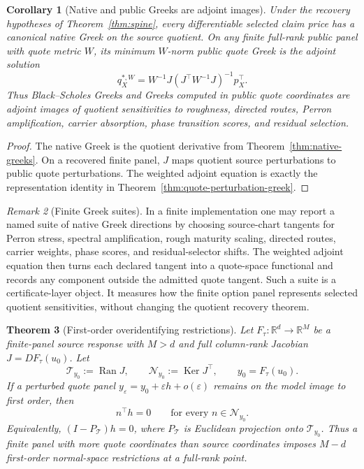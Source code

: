 \documentclass[11pt,a4paper]{amsart}
\theoremstyle{plain}
\newtheorem{theorem}{Theorem}[section]
\newtheorem{corollary}[theorem]{Corollary}
\theoremstyle{definition}
\theoremstyle{remark}
\newtheorem{remark}[theorem]{Remark}
\DeclareMathOperator{\Ker}{Ker}
\DeclareMathOperator{\Ran}{Ran}
\newcommand{\R}{\mathbb{R}}
\newcommand{\cN}{\mathcal{N}}
\newcommand{\cT}{\mathcal{T}}
\newcommand{\eps}{\varepsilon}
\begin{document}
\begin{corollary}[Native and public Greeks are adjoint images]\label{cor:native-public-greek-correspondence}
Under the recovery hypotheses of Theorem~\ref{thm:spine}, every differentiable selected claim
price has a canonical native Greek on the source quotient.  On any finite full-rank public panel
with quote metric \(W\), its minimum \(W\)-norm public quote Greek is the adjoint solution
\[
        q_X^{*,W}
        =
        W^{-1}J(J^\top W^{-1}J)^{-1}p_X^\top .
\]
Thus Black--Scholes Greeks and Greeks computed in public quote coordinates are adjoint images of
quotient sensitivities to roughness, directed routes, Perron amplification, carrier absorption,
phase transition scores, and residual selection.
\end{corollary}

\begin{proof}
The native Greek is the quotient derivative from Theorem~\ref{thm:native-greeks}.  On a recovered
finite panel, \(J\) maps quotient source perturbations to public quote perturbations.  The
weighted adjoint equation is exactly the representation identity in
Theorem~\ref{thm:quote-perturbation-greek}.
\end{proof}

\begin{remark}[Finite Greek suites]\label{rem:finite-greek-suites}
In a finite implementation one may report a named suite of native Greek directions by choosing
source-chart tangents for Perron stress, spectral amplification, rough maturity scaling, directed
routes, carrier weights, phase scores, and residual-selector shifts.  The weighted adjoint
equation then turns each declared tangent into a quote-space functional and records any component
outside the admitted quote tangent.  Such a suite is a certificate-layer object.  It measures how
the finite option panel represents selected quotient sensitivities, without changing the quotient
recovery theorem.
\end{remark}

\begin{theorem}[First-order overidentifying restrictions]\label{thm:overidentifying-restrictions}
Let \(F_\tau:\R^d\to\R^M\) be a finite-panel source response with \(M>d\) and full
column-rank Jacobian \(J=DF_\tau(u_0)\).  Let
\[
        \cT_{y_0}:=\Ran J,\qquad
        \cN_{y_0}:=\Ker J^\top,
        \qquad y_0=F_\tau(u_0).
\]
If a perturbed quote panel \(y_\eps=y_0+\eps h+o(\eps)\) remains on the model image to first
order, then
\[
        n^\top h=0
        \qquad\text{for every }n\in\cN_{y_0}.
\]
Equivalently, \((I-P_{\cT})h=0\), where \(P_{\cT}\) is Euclidean projection onto
\(\cT_{y_0}\).  Thus a finite panel with more quote coordinates than source coordinates imposes
\(M-d\) first-order normal-space restrictions at a full-rank point.
\end{theorem}
\end{document}
